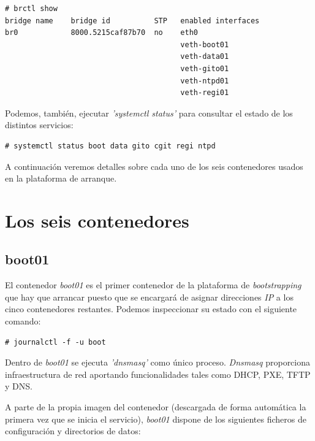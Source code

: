 \documentclass[a4paper,12pt,spanish,final]{epsc_tfc_pfc}
\begin{document}
\begin{lstlisting}[style=dnsmasq]
# brctl show
bridge name    bridge id          STP   enabled interfaces
br0            8000.5215caf87b70  no    eth0
                                        veth-boot01
                                        veth-data01
                                        veth-gito01
                                        veth-ntpd01
                                        veth-regi01
\end{lstlisting}

Podemos, también, ejecutar \emph{'systemctl status'} para consultar el estado de los distintos servicios:\\

\begin{lstlisting}[style=dnsmasq]
# systemctl status boot data gito cgit regi ntpd
\end{lstlisting}

A continuación veremos detalles sobre cada uno de los seis contenedores usados en la plataforma de arranque.

\clearpage

\section{Los seis contenedores}

\subsection{boot01}

El contenedor \emph{boot01} es el primer contenedor de la plataforma de \emph{bootstrapping} que hay que arrancar puesto que se encargará de asignar direcciones \emph{IP} a los cinco contenedores restantes.
Podemos inspeccionar su estado con el siguiente comando:\\

\begin{lstlisting}[style=dnsmasq]
# journalctl -f -u boot
\end{lstlisting}

Dentro de \emph{boot01} se ejecuta \emph{'dnsmasq'} como único proceso. \emph{Dnsmasq} proporciona infraestructura de red aportando funcionalidades tales como DHCP, PXE, TFTP y DNS.

A parte de la propia imagen del contenedor (descargada de forma automática la primera vez que se inicia el servicio), \emph{boot01} dispone de los siguientes ficheros de configuración y directorios de datos:
\end{document}

